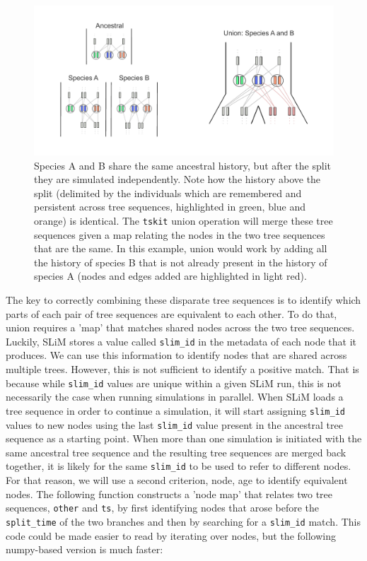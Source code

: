 \documentclass[12pt]{article}
\newcommand{\tskit}[0]{\texttt{tskit}\xspace}
\begin{document}
\begin{figure}[h!]
    \centering
     \includegraphics[width=\textwidth]{./figures/union.pdf}
     \caption{Species A and B share the same ancestral history, but after the split they are simulated independently. Note how the history above the split (delimited by the individuals which are remembered and persistent across tree sequences, highlighted in green, blue and orange) is identical. The \tskit union operation will merge these tree sequences given a map relating the nodes in the two tree sequences that are the same. In this example, union would work by adding all the history of species B that is not already present in the history of species A (nodes and edges added are highlighted in light red).}
     \label{fig:union}
    \end{figure}

The key to correctly combining these disparate tree sequences is to identify which parts of each pair of tree sequences are equivalent to each other. To do that, union requires
a 'map' that matches shared nodes across the two tree sequences. Luckily, SLiM stores a value called \verb|slim_id| in the metadata of each node that it produces. We can use this
information to identify nodes that are shared across multiple trees. However, this is not sufficient to identify a positive match. That is because while \verb|slim_id| values are unique
within a given SLiM run, this is not necessarily the case when running simulations in parallel. When SLiM loads a tree sequence in order to continue a simulation, it will start assigning
\verb|slim_id| values to new nodes using the last \verb|slim_id| value present in the ancestral tree sequence as a starting point. When more than one simulation is initiated with the same
ancestral tree sequence and the resulting tree sequences are merged back together, it is likely for the same \verb|slim_id| to be used to refer to different nodes. For that reason, we
will use a second criterion, node, age to identify equivalent nodes. The following function constructs a 'node map' that relates two tree sequences, \verb|other| and \verb|ts|, by
first identifying nodes that arose before the \verb|split_time| of the two branches and then by searching for a \verb|slim_id| match. This code could be made easier to read by iterating
over nodes, but the following numpy-based version is much faster:
\end{document}
